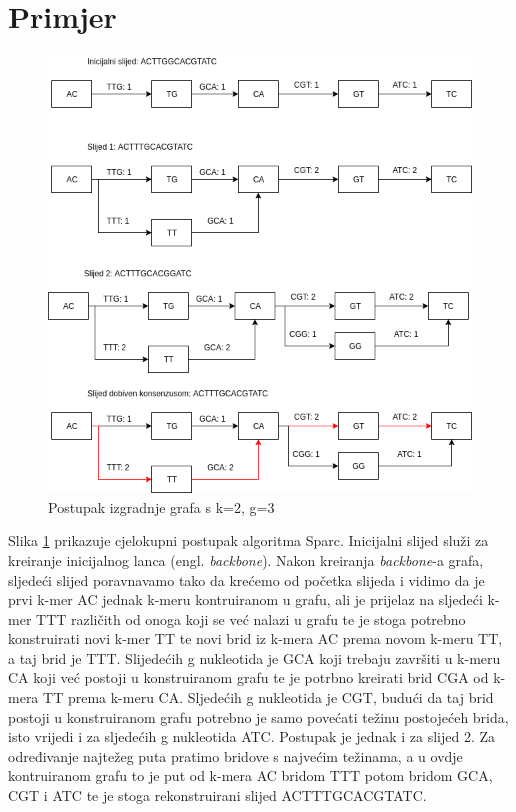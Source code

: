 \documentclass[times, utf8, seminar, numeric]{fer}
\begin{document}
\section{Primjer}
\begin{figure}[htb]
	\centering
	\includegraphics[scale=0.6]{images/backbone.png}
	\caption{Postupak izgradnje grafa s k=2, g=3}
	\label{picture:example}
\end{figure}

Slika \ref{picture:example} prikazuje cjelokupni postupak algoritma Sparc. Inicijalni slijed služi za kreiranje inicijalnog lanca (engl. \emph{backbone}). Nakon kreiranja \emph{backbone}-a grafa, sljedeći slijed poravnavamo tako da krećemo od početka slijeda i vidimo da je prvi k-mer AC jednak k-meru kontruiranom u grafu, ali je prijelaz na sljedeći k-mer TTT različith od onoga koji se već nalazi u grafu te je stoga potrebno konstruirati novi k-mer TT te novi brid iz k-mera AC prema novom k-meru TT, a taj brid je TTT. Slijedećih g nukleotida je GCA koji trebaju završiti u k-meru CA koji već postoji u konstruiranom grafu te je potrbno kreirati brid CGA od k-mera TT prema k-meru CA. Sljedećih g nukleotida je CGT, budući da taj brid postoji u konstruiranom grafu potrebno je samo povećati težinu postojećeh brida, isto vrijedi i za sljedećih g nukleotida ATC. Postupak je jednak i za slijed 2. Za određivanje najtežeg puta pratimo bridove s najvećim težinama, a u ovdje kontruiranom grafu to je put od k-mera AC bridom TTT potom bridom GCA, CGT i ATC te je stoga rekonstruirani slijed ACTTTGCACGTATC.
\end{document}

